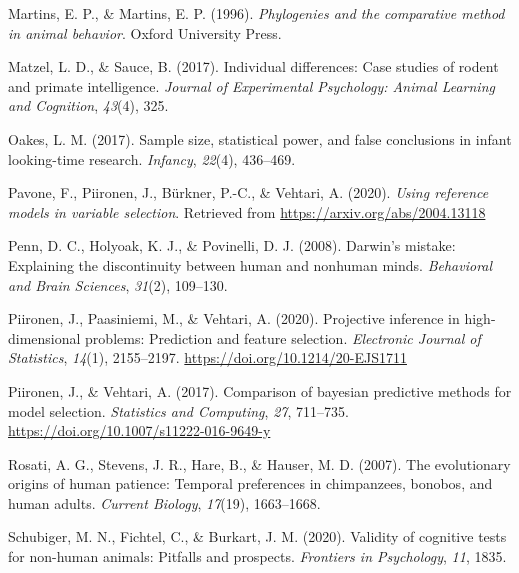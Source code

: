 \documentclass[
  man,floatsintext]{apa6}
\newlength{\cslhangindent}
\newlength{\cslentryspacingunit} %
\newenvironment{CSLReferences}[2] %
 {%
  \setlength{\parindent}{0pt}
  \ifodd #1
  \let\oldpar\par
  \def\par{\hangindent=\cslhangindent\oldpar}
  \fi
  \setlength{\parskip}{#2\cslentryspacingunit}
 }%
 {}
\begin{document}
\begin{CSLReferences}{1}{0}
\leavevmode{}%
Martins, E. P., \& Martins, E. P. (1996). \emph{Phylogenies and the comparative method in animal behavior}. Oxford University Press.

\leavevmode{}%
Matzel, L. D., \& Sauce, B. (2017). Individual differences: Case studies of rodent and primate intelligence. \emph{Journal of Experimental Psychology: Animal Learning and Cognition}, \emph{43}(4), 325.

\leavevmode{}%
Oakes, L. M. (2017). Sample size, statistical power, and false conclusions in infant looking-time research. \emph{Infancy}, \emph{22}(4), 436--469.

\leavevmode{}%
Pavone, F., Piironen, J., Bürkner, P.-C., \& Vehtari, A. (2020). \emph{Using reference models in variable selection}. Retrieved from \url{https://arxiv.org/abs/2004.13118}

\leavevmode{}%
Penn, D. C., Holyoak, K. J., \& Povinelli, D. J. (2008). Darwin's mistake: Explaining the discontinuity between human and nonhuman minds. \emph{Behavioral and Brain Sciences}, \emph{31}(2), 109--130.

\leavevmode{}%
Piironen, J., Paasiniemi, M., \& Vehtari, A. (2020). {Projective inference in high-dimensional problems: Prediction and feature selection}. \emph{Electronic Journal of Statistics}, \emph{14}(1), 2155--2197. \url{https://doi.org/10.1214/20-EJS1711}

\leavevmode{}%
Piironen, J., \& Vehtari, A. (2017). Comparison of bayesian predictive methods for model selection. \emph{Statistics and Computing}, \emph{27}, 711--735. \url{https://doi.org/10.1007/s11222-016-9649-y}

\leavevmode{}%
Rosati, A. G., Stevens, J. R., Hare, B., \& Hauser, M. D. (2007). The evolutionary origins of human patience: Temporal preferences in chimpanzees, bonobos, and human adults. \emph{Current Biology}, \emph{17}(19), 1663--1668.

\leavevmode{}%
Schubiger, M. N., Fichtel, C., \& Burkart, J. M. (2020). Validity of cognitive tests for non-human animals: Pitfalls and prospects. \emph{Frontiers in Psychology}, \emph{11}, 1835.


\end{CSLReferences}
\end{document}
